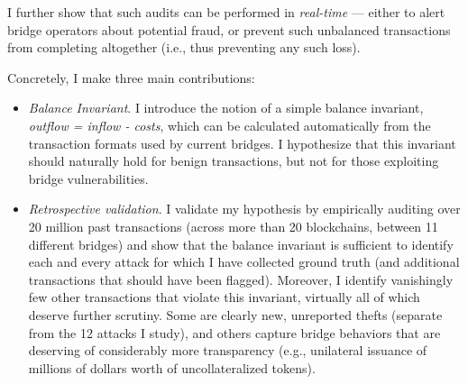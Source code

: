 I further show that such audits can be performed in \emph{real-time}
--- either to alert bridge operators about potential fraud, or prevent
such unbalanced transactions from completing altogether (i.e., thus
preventing any such loss).


Concretely, I make three main contributions:
\begin{itemize}
\item\emph{Balance Invariant}.  I introduce the notion of a simple
  balance invariant, \emph{outflow = inflow - costs}, which can be
  calculated automatically from the transaction formats used by
  current bridges.  I hypothesize that this invariant should naturally hold for benign
  transactions, but not for those exploiting bridge vulnerabilities.

\item\emph{Retrospective validation}.  I validate my hypothesis by
  empirically auditing over 20 million past transactions (across more
  than 20 blockchains, between 11 different bridges) and show that the
  balance invariant is sufficient to identify each and every attack
  for which I have collected ground truth (and additional transactions that should have been flagged).  Moreover, I identify
  vanishingly few other transactions that violate this invariant,
  virtually all of which deserve further scrutiny. Some are clearly new, unreported thefts (separate from the 12 attacks I study), and others capture bridge behaviors that are deserving of considerably more transparency (e.g., unilateral issuance of millions of dollars worth of uncollateralized tokens).



\end{itemize}
